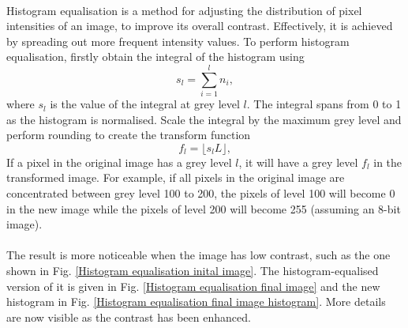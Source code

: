\documentclass[12pt, twocolumn]{report}
\begin{document}
\paragraph{}
Histogram equalisation is a method for adjusting the distribution of pixel intensities of an image, to improve its overall contrast. Effectively, it is achieved by spreading out more frequent intensity values. To perform histogram equalisation, firstly obtain the integral of the histogram using
\[s_l = \sum_{i=1}^{l} n_i,\]
where $s_l$ is the value of the integral at grey level $l$. The integral spans from 0 to 1 as the histogram is normalised. Scale the integral by the maximum grey level and perform rounding to create the transform function
\begin{equation}
    f_l = \lfloor s_lL \rfloor,
    \label{Histogram equalisation transform function}
\end{equation}
If a pixel in the original image has a grey level $l$, it will have a grey level $f_l$ in the transformed image. For example, if all pixels in the original image are concentrated between grey level 100 to 200, the pixels of level 100 will become 0 in the new image while the pixels of level 200 will become 255 (assuming an 8-bit image).

\paragraph{}
The result is more noticeable when the image has low contrast, such as the one shown in Fig. \ref{Histogram equalisation inital image}. The histogram-equalised version of it is given in Fig. \ref{Histogram equalisation final image} and the new histogram in Fig. \ref{Histogram equalisation final image histogram}. More details are now visible as the contrast has been enhanced.
\end{document}
